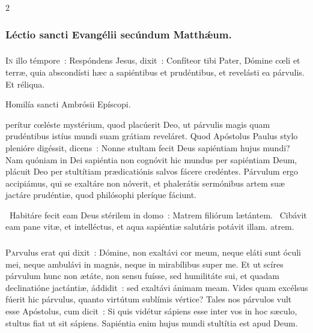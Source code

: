 \documentclass[9pt,twoside]{extarticle}
\begin{document}
\begin{multicols}{2}
\subsubsection*{\center Léctio sancti Evangélii secúndum Matthǽum.}
\subsubsection*{\center {}}
\lettrine{I}n illo témpore~: Respóndens Jesus, dixit~: Confíteor tibi Pater, Dómine cœli et terræ, quia abscondísti hæc a sapiéntibus et prudéntibus, et revelásti ea párvulis. Et réliqua.

\begin{center}Homilía sancti Ambrósii Epíscopi.\\
\end{center}
perítur cœléste mystérium, quod placúerit Deo, ut párvulis magis quam prudéntibus istíus mundi suam grátiam reveláret. Quod Apóstolus Paulus stylo plenióre digéssit, dicens~: Nonne stultam fecit Deus sapiéntiam hujus mundi? Nam quóniam in Dei sapiéntia non cognóvit hic mundus per sapiéntiam Deum, plácuit Deo per stultítiam prædicatiónis salvos fácere credéntes. Párvulum ergo accipiámus, qui se exaltáre non nóverit, et phalerátis sermónibus artem suæ jactáre prudéntiæ, quod philósophi pleríque fáciunt.

\begin{tightlist}{}
\item {}~Habitáre fecit eam Deus stérilem in domo~: \textred{*} Matrem filiórum lætántem. ~Cibávit eam pane vitæ, et intelléctus, et aqua sapiéntiæ salutáris potávit illam. atrem.
\end{tightlist}

\subsubsection*{\center {}}
\lettrine{P}arvulus erat qui dixit~: Dómine, non exaltávi cor meum, neque eláti sunt óculi mei, neque ambulávi in magnis, neque in mirabílibus super me. Et ut scíres párvulum hunc non ætáte, non sensu fuísse, sed humilitáte sui, et quadam declinatióne jactántiæ, áddidit~: sed exaltávi ánimam meam. Vides quam excélsus fúerit hic párvulus, quanto virtútum sublímis vértice? Tales nos párvulos vult esse Apóstolus, cum dicit~: Si quis vidétur sápiens esse inter vos in hoc sæculo, stultus fiat ut sit sápiens. Sapiéntia enim hujus mundi stultítia est apud Deum.


\end{multicols}
\end{document}
